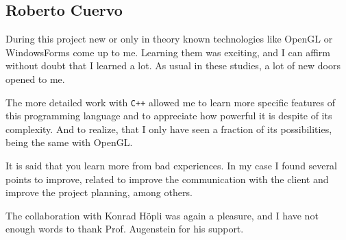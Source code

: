 \subsection{Roberto Cuervo}

During this project new or only in theory known technologies like OpenGL or WindowsForms come up to me. Learning them was exciting, and I can affirm without doubt that I learned a lot. As usual in these studies, a lot of new doors opened to me.

The more detailed work with \verb|C++| allowed me to learn more specific features of this programming language and to appreciate how powerful it is despite of its complexity. And to realize, that I only have seen a fraction of its possibilities, being the same with OpenGL.

It is said that you learn more from bad experiences. In my case I found several points to improve, related to improve the communication with the client and improve the project planning, among others.

The collaboration with Konrad H\"opli was again a pleasure, and I have not enough words to thank Prof. Augenstein for his support.